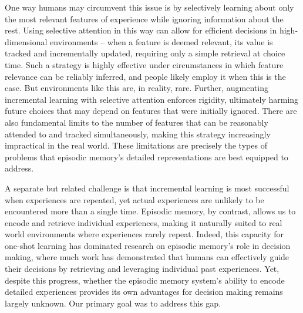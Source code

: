 \documentclass[10pt,letterpaper]{article}
\begin{document}
One way humans may circumvent this issue is by selectively learning about only the most relevant features of experience while ignoring information about the rest\cite{wilsonInferringRelevanceChanging2012}. Using selective attention in this way can allow for efficient decisions in high-dimensional environments -- when a feature is deemed relevant, its value is tracked and incrementally updated, requiring only a simple retrieval at choice time. Such a strategy is highly effective under circumstances in which feature relevance can be reliably inferred, and people likely employ it when this is the case\cite{leongDynamicInteractionReinforcement2017, nivReinforcementLearningMultidimensional2015}. But environments like this are, in reality, rare. Further, augmenting incremental learning with selective attention enforces rigidity, ultimately harming future choices that may depend on features that were initially ignored. There are also fundamental limits to the number of features that can be reasonably attended to and tracked simultaneously\cite{millerMagicalNumberSeven1956}, making this strategy increasingly impractical in the real world. These limitations are precisely the types of problems that episodic memory's detailed representations are best equipped to address.

A separate but related challenge is that incremental learning is most successful when experiences are repeated, yet actual experiences are unlikely to be encountered more than a single time. Episodic memory, by contrast, allows us to encode and retrieve individual experiences, making it naturally suited to real world environments where experiences rarely repeat\cite{gershmanReinforcementLearningEpisodic2017}. Indeed, this capacity for one-shot learning has dominated research on episodic memory's role in decision making, where much work has demonstrated that humans can effectively guide their decisions by retrieving and leveraging individual past experiences\cite{bornsteinRemindersChoicesBias2017, duncanModulatingUseMultiple2019, masonBiasedConfabulationRisky2020, nicholasUncertaintyAltersBalance2022a, montaser-kouhsariTwoRoutesValuebased2024, plonskyRelianceSmallSamples2015}. Yet, despite this progress, whether the episodic memory system's ability to encode detailed experiences provides its own advantages for decision making remains largely unknown. Our primary goal was to address this gap.
\end{document}
